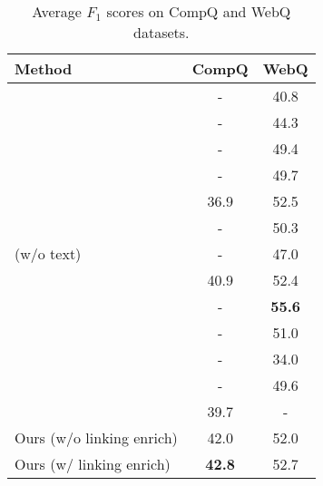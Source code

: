 \begin{table}[ht]
    \small
    \centering
    \begin{tabular} {l|c|c}
        \hline
        Method  &   CompQ  & WebQ \\
        \hline
        \citet{dong2015question}        &   -   & 40.8  \\
        \citet{yao2015lean}             &   -   & 44.3  \\
        \citet{bast2015more}            &   -   & 49.4  \\
        \citet{berant2015imitation}     &   -   & 49.7  \\
        \citet{yih2015semantic}         & 36.9  & 52.5  \\
        \citet{reddy2016transforming}   &   -   & 50.3  \\
        \citet{xu2016question} (w/o text)
                                        &   -   & 47.0  \\
        \citet{bao2016constraint}       & 40.9  & 52.4  \\
        \citet{jain2016question}        &   -   & \textbf{55.6}  \\
        \citet{abujabal2017automated}   &   -   & 51.0  \\
        \citet{cui2017kbqa}             &   -   & 34.0  \\     
        \citet{hu2018answering}         &   -   & 49.6  \\
        \citet{talmor2018web}           & 39.7  &   -   \\
        \hline
        Ours (w/o linking enrich)       & 42.0  & 52.0  \\
        Ours (w/ linking enrich)        & \textbf{42.8}  & 52.7  \\
        \hline
    \end{tabular}
    \caption{Average $F_1$ scores on CompQ and WebQ datasets.}
    \label{tab:compq-e2e}
\end{table}


